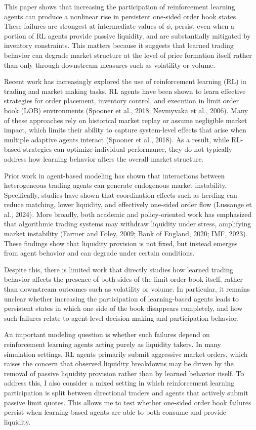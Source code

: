 \documentclass[sigconf]{acmart}
\begin{document}
This paper shows that increasing the participation of reinforcement learning agents can produce a nonlinear rise in persistent one-sided order book states. These failures are strongest at intermediate values of $\phi$, persist even when a portion of RL agents provide passive liquidity, and are substantially mitigated by inventory constraints. This matters because it suggests that learned trading behavior can degrade market structure at the level of price formation itself rather than only through downstream measures such as volatility or volume.

Recent work has increasingly explored the use of reinforcement learning (RL) in trading and market making tasks. RL agents have been shown to learn effective strategies for order placement, inventory control, and execution in limit order book (LOB) environments (Spooner et al., 2018; Nevmyvaka et al., 2006). Many of these approaches rely on historical market replay or assume negligible market impact, which limits their ability to capture system-level effects that arise when multiple adaptive agents interact (Spooner et al., 2018). As a result, while RL-based strategies can optimize individual performance, they do not typically address how learning behavior alters the overall market structure.

Prior work in agent-based modeling has shown that interactions between heterogeneous trading agents can generate endogenous market instability. Specifically, studies have shown that coordination effects such as herding can reduce matching, lower liquidity, and effectively one-sided order flow (Lussange et al., 2024). More broadly, both academic and policy-oriented work has emphasized that algorithmic trading systems may withdraw liquidity under stress, amplifying market instability (Farmer and Foley, 2009; Bank of England, 2020; IMF, 2023). These findings show that liquidity provision is not fixed, but instead emerges from agent behavior and can degrade under certain conditions.

Despite this, there is limited work that directly studies how learned trading behavior affects the presence of both sides of the limit order book itself, rather than downstream outcomes such as volatility or volume. In particular, it remains unclear whether increasing the participation of learning-based agents leads to persistent states in which one side of the book disappears completely, and how such failures relate to agent-level decision making and participation behavior.

An important modeling question is whether such failures depend on reinforcement learning agents acting purely as liquidity takers. In many simulation settings, RL agents primarily submit aggressive market orders, which raises the concern that observed liquidity breakdowns may be driven by the removal of passive liquidity provision rather than by learned behavior itself. To address this, I also consider a mixed setting in which reinforcement learning participation is split between directional traders and agents that actively submit passive limit quotes. This allows me to test whether one-sided order book failures persist when learning-based agents are able to both consume and provide liquidity.
\end{document}
